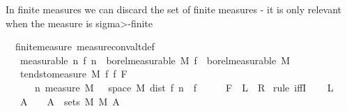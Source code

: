 \begin{isabellebody}
%
\isadelimproof
%
\endisadelimproof
%
\begin{isamarkuptext}%
In finite measures we can discard the set of finite measures - it is only relevant when
  the measure is \<sigma>-finite%
\end{isamarkuptext}\isamarkuptrue%
\isamarkupfalse%
\ {\isacharparenleft}{\kern0pt}\ finite{\isacharunderscore}{\kern0pt}measure{\isacharparenright}{\kern0pt}\ measure{\isacharunderscore}{\kern0pt}conv{\isacharunderscore}{\kern0pt}altdef{\isacharcolon}{\kern0pt}\isanewline
\ \ \ {\isacharbrackleft}{\kern0pt}measurable{\isacharbrackright}{\kern0pt}{\isacharcolon}{\kern0pt}\ {\isachardoublequoteopen}{\isasymAnd}n{\isachardot}{\kern0pt}\ f{\isacharprime}{\kern0pt}\ n\ {\isasymin}\ borel{\isacharunderscore}{\kern0pt}measurable\ M{\isachardoublequoteclose}\ {\isachardoublequoteopen}f\ {\isasymin}\ borel{\isacharunderscore}{\kern0pt}measurable\ M{\isachardoublequoteclose}\isanewline
\ \ \ {\isachardoublequoteopen}tendsto{\isacharunderscore}{\kern0pt}measure\ M\ f{\isacharprime}{\kern0pt}\ f\ F\ {\isasymlongleftrightarrow}\isanewline
\ \ \ {\isacharparenleft}{\kern0pt}{\isasymforall}{\isasymepsilon}\ {\isachargreater}{\kern0pt}\ {}{\isachardot}{\kern0pt}\ {\isacharparenleft}{\kern0pt}{\isacharparenleft}{\kern0pt}{\isasymlambda}n{\isachardot}{\kern0pt}\ measure\ M\ {\isacharbraceleft}{\kern0pt}{\isasymomega}\ {\isasymin}\ space\ M{\isachardot}{\kern0pt}\ dist\ {\isacharparenleft}{\kern0pt}f{\isacharprime}{\kern0pt}\ n\ {\isasymomega}{\isacharparenright}{\kern0pt}\ {\isacharparenleft}{\kern0pt}f\ {\isasymomega}{\isacharparenright}{\kern0pt}\ {\isachargreater}{\kern0pt}\ {\isasymepsilon}{\isacharbraceright}{\kern0pt}{\isacharparenright}{\kern0pt}\ {\isasymlonglongrightarrow}\ {}{\isacharparenright}{\kern0pt}\ F{\isacharparenright}{\kern0pt}{\isachardoublequoteclose}\ {\isacharparenleft}{\kern0pt}\ {\isachardoublequoteopen}{\isacharquery}{\kern0pt}L\ {\isasymlongleftrightarrow}\ {\isacharquery}{\kern0pt}R{\isachardoublequoteclose}{\isacharparenright}{\kern0pt}\isanewline
%
\isadelimproof
%
\endisadelimproof
%
\isatagproof
{}\isamarkupfalse%
\ {\isacharparenleft}{\kern0pt}rule\ iffI{\isacharparenright}{\kern0pt}\isanewline
\ \ \isamarkupfalse%
\ {\isacharquery}{\kern0pt}L\isanewline
\ \ \isamarkupfalse%
\ \isamarkupfalse%
\ {\isacharasterisk}{\kern0pt}{\isacharcolon}{\kern0pt}\ {\isachardoublequoteopen}{\isasymAnd}{\isasymepsilon}\ A{\isachardot}{\kern0pt}\ {\isasymlbrakk}{\isasymepsilon}\ {\isachargreater}{\kern0pt}\ {}{\isacharsemicolon}{\kern0pt}\ A\ {\isasymin}\ sets\ M{\isacharsemicolon}{\kern0pt}\ M\ A\ {\isasymnoteq}\ {\isasymtop}{\isasymrbrakk}\ {\isasymLongrightarrow}\isanewline

\end{isabellebody}
